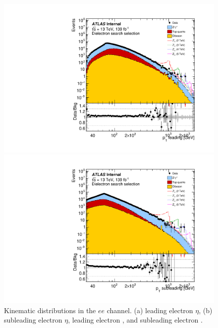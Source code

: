 {\begin{figure}[h!]
\begin{minipage}[b]{.45\linewidth}
    \includegraphics[width=1\textwidth]{figures/ci/dataMc/stacks_mc16e_2015-2018_ee_pt1_log100.pdf}
    \subcaption{}
\end{minipage}
\begin{minipage}[b]{.45\linewidth}
    \includegraphics[width=1\textwidth]{figures/ci/dataMc/stacks_mc16e_2015-2018_ee_pt2_log100.pdf}
    \subcaption{}
\end{minipage}
\caption{Kinematic distributions in the $ee$ channel. (a) leading electron $\eta$, (b) subleading electron $\eta$, leading electron \pt, and subleading electron \pt.}
\label{fig:}
\end{figure}
\clearpage
}

